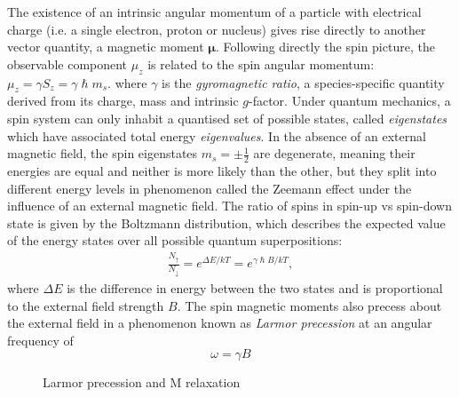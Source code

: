 The existence of an intrinsic angular momentum of a particle with electrical charge (i.e. a single electron, proton or nucleus) gives rise directly to another vector quantity, a magnetic moment $\bm{\mu}$.
Following directly the spin picture, the observable component $\mu_z$ is related to the spin angular momentum: $\mu_z = \gamma S_z = \gamma \hslash m_s $.
where $\gamma$ is the \textit{gyromagnetic ratio}, a species-specific quantity derived from its charge, mass and intrinsic $g$-factor.
Under quantum mechanics, a spin system can only inhabit a quantised set of possible states, called \textit{eigenstates} which have associated total energy \textit{eigenvalues}.
In the absence of an external magnetic field, the spin eigenstates $m_s = \pm \frac{1}{2}$ are degenerate, meaning their energies are equal and neither is more likely than the other, but they split into different energy levels in phenomenon called the Zeemann effect under the influence of an external magnetic field.
The ratio of spins in spin-up vs spin-down state is given by the Boltzmann distribution, which describes the expected value of the energy states over all possible quantum superpositions:
\begin{align}
  \frac{N_{\uparrow}}{N_{\downarrow}} = e^{\Delta E / k T} = e^{\gamma \hslash B / k T}, \label{eq:boltzmann}
\end{align}
where $\Delta E$ is the difference in energy between the two states and is proportional to the external field strength $B$.
The spin magnetic moments also precess about the external field in a phenomenon known as \textit{Larmor precession} at an angular frequency of
\begin{equation}
  \omega = \gamma B
\end{equation}

\begin{SCfigure}
  \begin{subfigure}[b]{0.33\textwidth}
    
  \end{subfigure}%
  \begin{subfigure}[b]{0.33\textwidth}
    
  \end{subfigure}%
  \caption{Larmor precession and M relaxation }
\end{SCfigure}

